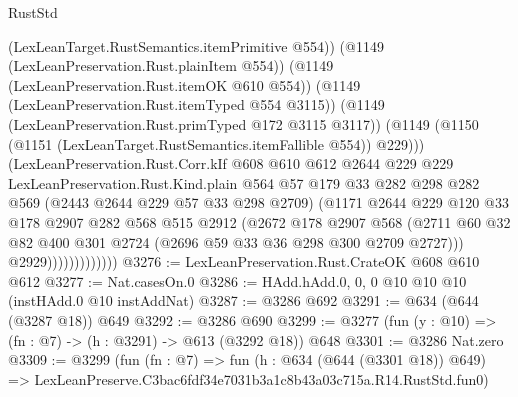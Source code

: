 \begin{lexlean}{RustStd}
\begin{coremodule}
                              (LexLeanTarget.RustSemantics.itemPrimitive @554))
                            (@1149 (LexLeanPreservation.Rust.plainItem @554))
                            (@1149 (LexLeanPreservation.Rust.itemOK @610 @554))
                            (@1149 (LexLeanPreservation.Rust.itemTyped @554 @3115))
                            (@1149 (LexLeanPreservation.Rust.primTyped @172 @3115 @3117))
                            (@1149
                              (@1150 (@1151 (LexLeanTarget.RustSemantics.itemFallible @554)) @229)))
                          (LexLeanPreservation.Rust.Corr.kIf
                            @608
                            @610
                            @612
                            @2644
                            @229
                            @229
                            LexLeanPreservation.Rust.Kind.plain
                            @564
                            @57
                            @179
                            @33
                            @282
                            @298
                            @282
                            @569
                            (@2443 @2644 @229 @57 @33 @298 @2709)
                            (@1171
                              @2644
                              @229
                              @120
                              @33
                              @178
                              @2907
                              @282
                              @568
                              @515
                              @2912
                              (@2672
                                @178
                                @2907
                                @568
                                (@2711
                                  @60
                                  @32
                                  @82
                                  @400
                                  @301
                                  @2724
                                  (@2696 @59 @33 @36 @298 @300 @2709 @2727)))
                              @2929)))))))))))))
@3276 := LexLeanPreservation.Rust.CrateOK @608 @610 @612
@3277 := Nat.casesOn.{0}
@3286 := HAdd.hAdd.{0, 0, 0} @10 @10 @10 (instHAdd.{0} @10 instAddNat)
@3287 := @3286 @692
@3291 := @634 (@644 (@3287 @18)) @649
@3292 := @3286 @690
@3299 := @3277 (fun (y : @10) => (fn : @7) -> (h : @3291) -> @613 (@3292 @18)) @648
@3301 := @3286 Nat.zero
@3309 := @3299
    (fun (fn : @7) =>
    fun (h : @634 (@644 (@3301 @18)) @649) =>
    LexLeanPreserve.C3bac6fdf34e7031b3a1c8b43a03c715a.R14.RustStd.fun0)

\end{coremodule}
\end{lexlean}
